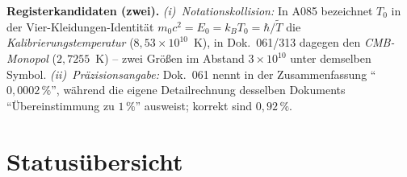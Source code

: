 \documentclass[11pt]{report}
\begin{document}
\textbf{Registerkandidaten (zwei).} \emph{(i)~Notationskollision:}
In A085 bezeichnet $T_0$ in der Vier-Kleidungen-Identität
$m_0c^2 = E_0 = k_BT_0 = \hbar/\tilde T$ die
\emph{Kalibrierungstemperatur} ($8{,}53\times10^{10}$~K), in
Dok.~061/313 dagegen den \emph{CMB-Monopol} ($2{,}7255$~K) -- zwei
Größen im Abstand $3\times10^{10}$ unter demselben Symbol.
\emph{(ii)~Präzisionsangabe:} Dok.~061 nennt in der Zusammenfassung
\enquote{$0{,}0002\,\%$}, während die eigene Detailrechnung
desselben Dokuments \enquote{Übereinstimmung zu $1\,\%$} ausweist;
korrekt sind $0{,}92\,\%$.

\chapter{Statusübersicht}
\end{document}
